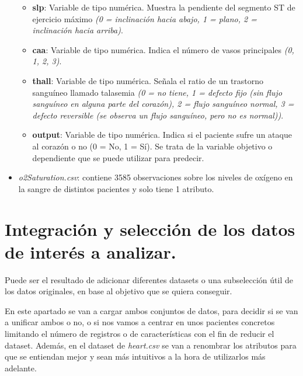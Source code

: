 \documentclass[
]{article}
\begin{document}
\begin{itemize}
\begin{itemize}
  \item
    \textbf{slp}: Variable de tipo numérica. Muestra la pendiente del
    segmento ST de ejercicio máximo \emph{(0 = inclinación hacia abajo,
    1 = plano, 2 = inclinación hacia arriba)}.
  \item
    \textbf{caa}: Variable de tipo numérica. Indica el número de vasos
    principales \emph{(0, 1, 2, 3)}.
  \item
    \textbf{thall}: Variable de tipo numérica. Señala el ratio de un
    trastorno sanguíneo llamado talasemia \emph{(0 = no tiene, 1 =
    defecto fijo (sin flujo sanguíneo en alguna parte del corazón), 2 =
    flujo sanguíneo normal, 3 = defecto reversible (se observa un flujo
    sanguíneo, pero no es normal))}.
  \item
    \textbf{output}: Variable de tipo numérica. Indica si el paciente
    sufre un ataque al corazón o no (0 = No, 1 = Sí). Se trata de la
    variable objetivo o dependiente que se puede utilizar para predecir.
  \end{itemize}
\item
  \emph{o2Saturation.csv}: contiene 3585 observaciones sobre los niveles
  de oxígeno en la sangre de distintos pacientes y solo tiene 1
  atributo.
\end{itemize}

\hypertarget{integraciuxf3n-y-selecciuxf3n-de-los-datos-de-interuxe9s-a-analizar.}{%
\section{Integración y selección de los datos de interés a
analizar.}\label{integraciuxf3n-y-selecciuxf3n-de-los-datos-de-interuxe9s-a-analizar.}}

Puede ser el resultado de adicionar diferentes datasets o una
subselección útil de los datos originales, en base al objetivo que se
quiera conseguir.

En este apartado se van a cargar ambos conjuntos de datos, para decidir
si se van a unificar ambos o no, o si nos vamos a centrar en unos
pacientes concretos limitando el número de registros o de
características con el fin de reducir el dataset. Además, en el dataset
de \emph{heart.csv} se van a renombrar los atributos para que se
entiendan mejor y sean más intuitivos a la hora de utilizarlos más
adelante.
\end{document}
